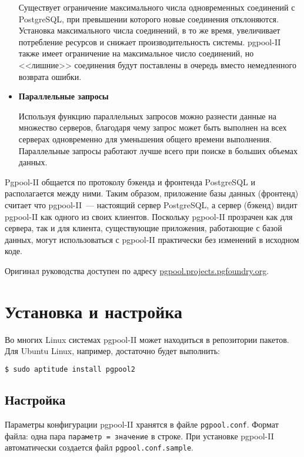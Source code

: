 \begin{itemize}
Существует ограничение максимального числа одновременных соединений с PostgreSQL, при превышении которого новые соединения отклоняются. Установка максимального числа соединений, в то же время, увеличивает потребление ресурсов и снижает производительность системы. pgpool-II также имеет ограничение на максимальное число соединений, но <<лишние>> соединения будут поставлены в очередь вместо немедленного возврата ошибки.

\item \textbf{Параллельные запросы}

Используя функцию параллельных запросов можно разнести данные на множество серверов, благодаря чему запрос может быть выполнен на всех серверах одновременно для уменьшения общего времени выполнения. Параллельные запросы работают лучше всего при поиске в больших объемах данных.

\end{itemize}

Pgpool-II общается по протоколу бэкенда и фронтенда PostgreSQL и располагается между ними. Таким образом, приложение базы данных (фронтенд) считает что pgpool-II~--- настоящий сервер PostgreSQL, а сервер (бэкенд) видит pgpool-II как одного из своих клиентов. Поскольку pgpool-II прозрачен как для сервера, так и для клиента, существующие приложения, работающие с базой данных, могут использоваться с pgpool-II практически без изменений в исходном коде.

Оригинал руководства доступен по адресу \href{http://pgpool.projects.pgfoundry.org/pgpool-II/doc/tutorial-en.html}{pgpool.projects.pgfoundry.org}.

\section{Установка и настройка}
\label{sec:pgpool-II-begin}

Во многих Linux системах pgpool-II может находиться в репозитории пакетов. Для Ubuntu Linux, например, достаточно будет выполнить:

\begin{lstlisting}[language=Bash,label=lst:pgpool3,caption=Установка pgpool-II]
$ sudo aptitude install pgpool2
\end{lstlisting}

\subsection{Настройка}

Параметры конфигурации pgpool-II хранятся в файле \lstinline!pgpool.conf!. Формат файла: одна пара \lstinline!параметр = значение! в строке. При установке pgpool-II автоматически создается файл \lstinline!pgpool.conf.sample!.

